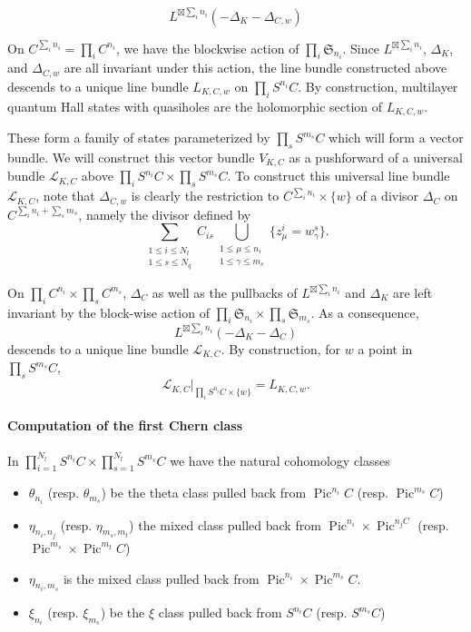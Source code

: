 \documentclass{article}
\theoremstyle{definition}
\DeclareMathOperator{\pic}{\text{Pic}}
\renewcommand{\leq}{\leqslant}
\begin{document}
\begin{equation}
    L^{\boxtimes \sum_i n_i}(-\Delta_K-\Delta_{C,w})
\end{equation}


On $C^{\sum_i n_i}=\prod_i C^{n_i}$, we have the blockwise action of $\prod_i \mathfrak{S}_{n_i}$. Since $L^{\boxtimes \sum_i n_i}$, $\Delta_K$, and $\Delta_{C,w}$ are all invariant under this action, the line bundle constructed above descends to a unique line bundle $L_{K,C,w}$ on $\prod_i S^{n_i} C$. By construction, multilayer quantum Hall states with quasiholes are the holomorphic section of $L_{K,C,w}$.

These form a family of states parameterized by $\prod_s S^{m_s} C$ which will form a vector bundle. We will construct this vector bundle $V_{K,C}$ as a pushforward of a universal bundle $\mathcal{L}_{K,C}$ above $\prod_i S^{n_i} C \times \prod_s S^{m_s} C$. To construct this universal line bundle $\mathcal{L}_{K,C}$, note that $\Delta_{C,w}$ is clearly the restriction to $C^{\sum_i n_i}\times \{w\} $ of a divisor $\Delta_C$ on $C^{\sum_i n_i+\sum_s m_s} $, namely the divisor defined by $$\sum_{\substack{1\leq i\leq {N_l}\\ 1\leq s \leq {N_q}}} C_{is} \bigcup_{\substack{1 \le \mu \le n_i \\ 1 \le \gamma \le m_s}} \{ z^i_\mu = w^s_\gamma \}.$$






On $\prod_i C^{n_i} \times \prod_s C^{m_s}$, $\Delta_C$ as well as the pullbacks of $L^{\boxtimes \sum_i n_i}$ and $\Delta_K$ are left invariant by the block-wise action of $\prod_i \mathfrak{S}_{n_i} \times  \prod_s \mathfrak{S}_{m_s}$. As a consequence, $$L^{\boxtimes \sum_i n_i}(-\Delta_K-\Delta_C)$$ descends to a unique line bundle $\mathcal{L}_{K,C}$. By construction, for $w$ a point in $\prod_s S^{m_s} C$, $$\mathcal{L}_{K,C}|_{\prod_i S^{n_i} C \times \lbrace w \rbrace}=L_{K,C,w}.$$


\paragraph{Computation of the first Chern class}

In $\prod_{i=1}^{N_l} S^{n_i} C \times\prod_{s=1}^{N_l} S^{m_s}C$ we have the natural cohomology classes


\begin{itemize}
    \item $\theta_{n_i}$ (resp. $\theta_{m_s}$) be the theta class pulled back from  $\pic^{n_i}C$ (resp. $\pic^{m_s}C$)
    \item  $\eta_{n_i,n_j}$ (resp. $\eta_{m_s,m_t}$) the mixed class pulled back from $\pic^{n_i} \times \pic^{n_jC}$ (resp. $\pic^{m_s} \times \pic^{m_t}C$)
    \item  $\eta_{n_i,m_s}$ is the mixed class pulled back from $\pic^{n_i} \times \pic^{m_s}C$.
    \item $\xi_{n_i}$ (resp. $\xi_{m_s}$) be the $\xi$ class pulled back from $S^{n_i} C$ (resp. $S^{m_s} C$)
\end{itemize}
\end{document}
